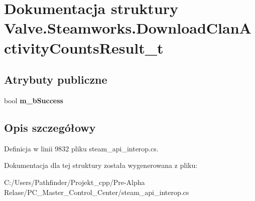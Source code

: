 \hypertarget{struct_valve_1_1_steamworks_1_1_download_clan_activity_counts_result__t}{}\section{Dokumentacja struktury Valve.\+Steamworks.\+Download\+Clan\+Activity\+Counts\+Result\+\_\+t}
\label{struct_valve_1_1_steamworks_1_1_download_clan_activity_counts_result__t}
\subsection*{Atrybuty publiczne}
\begin{DoxyCompactItemize}
\item 
\mbox{\label{struct_valve_1_1_steamworks_1_1_download_clan_activity_counts_result__t_add4bfbfae0cbb0e3595b86ae71e3b9bf}} 
bool {\bfseries m\+\_\+b\+Success}
\end{DoxyCompactItemize}


\subsection{Opis szczegółowy}


Definicja w linii 9832 pliku steam\+\_\+api\+\_\+interop.\+cs.



Dokumentacja dla tej struktury została wygenerowana z pliku\+:\begin{DoxyCompactItemize}
\item 
C\+:/\+Users/\+Pathfinder/\+Projekt\+\_\+cpp/\+Pre-\/\+Alpha Relase/\+P\+C\+\_\+\+Master\+\_\+\+Control\+\_\+\+Center/steam\+\_\+api\+\_\+interop.\+cs\end{DoxyCompactItemize}
